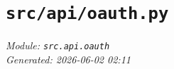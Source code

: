 
\section{\texttt{src/api/oauth.py}}
\textit{Module: \texttt{src.api.oauth}} \\
\textit{Generated: 2026-06-02 02:11} \\
